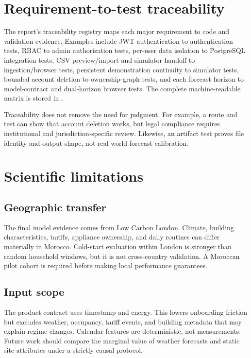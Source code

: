\section{Requirement-to-test traceability}

The report's traceability registry maps each major requirement to code and validation evidence. Examples include JWT authentication to authentication tests, RBAC to admin authorization tests, per-user data isolation to PostgreSQL integration tests, CSV preview/import and simulator handoff to ingestion/browser tests, persistent demonstration continuity to simulator tests, bounded account deletion to ownership-graph tests, and each forecast horizon to model-contract and dual-horizon browser tests. The complete machine-readable matrix is stored in .

Traceability does not remove the need for judgment. For example, a route and test can show that account deletion works, but legal compliance requires institutional and jurisdiction-specific review. Likewise, an artifact test proves file identity and output shape, not real-world forecast calibration.

\section{Scientific limitations}

\subsection{Geographic transfer}

The final model evidence comes from Low Carbon London. Climate, building characteristics, tariffs, appliance ownership, and daily routines can differ materially in Morocco. Cold-start evaluation within London is stronger than random household windows, but it is not cross-country validation. A Moroccan pilot cohort is required before making local performance guarantees.

\subsection{Input scope}

The product contract uses timestamp and energy. This lowers onboarding friction but excludes weather, occupancy, tariff events, and building metadata that may explain regime changes. Calendar features are deterministic, not measurements. Future work should compare the marginal value of weather forecasts and static site attributes under a strictly causal protocol.

